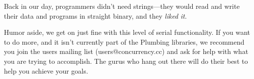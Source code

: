 \discussion
Back in our day, programmers didn't need strings---they would read and write their data and programs in straight binary, and they \emph{liked it}.

Humor aside, we get on just fine with this level of serial functionality. If you want to do more, and it isn't currently part of the Plumbing libraries, we recommend you join the users mailing list ({\code users@concurrency.cc}) and ask for help with what you are trying to accomplish. The \occam gurus who hang out there will do their best to help you achieve your goals.

\makingthingsbreak

\XXX

\seealso

\XXX